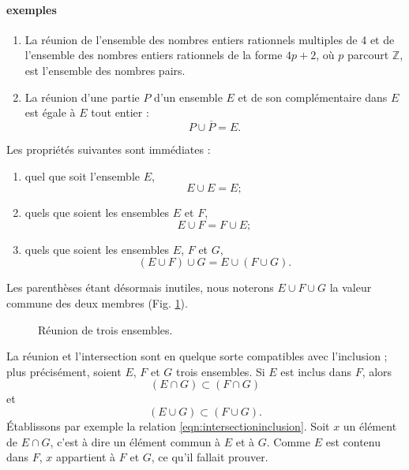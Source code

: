 \documentclass[12pt,parskip=full,chapterprefix=true,a5paper]{scrbook}
\begin{document}
\paragraph{exemples}
\begin{enumerate}
\item La réunion de l'ensemble des nombres entiers rationnels multiples de 4 et de l'ensemble des nombres entiers rationnels de la forme \(4p+2\), où \(p\) parcourt \(\mathbb{Z}\), est l'ensemble des nombres pairs.
\item La réunion d'une partie \(P\) d'un ensemble \(E\) et de son complémentaire dans \(E\) est égale à \(E\) tout entier :
  \[
    P\cup\overline{P}=E.
  \]
\end{enumerate}
Les propriétés suivantes sont immédiates :
\begin{enumerate}[label=\alph*)]
\item quel que soit l'ensemble \(E\),
  \[E\cup E=E;\]
\item quels que soient les ensembles \(E\) et \(F\),
  \[E\cup F=F\cup E;\]
\item quels que soient les ensembles \(E\), \(F\) et \(G\),
  \[(E\cup F)\cup G=E\cup (F\cup G).\]
\end{enumerate}
Les parenthèses étant désormais inutiles, nous noterons \(E\cup F\cup G\) la valeur commune des deux membres (Fig. \ref{fig:reunion3ensembles}).

\begin{figure}[ht]
  \centering
  \caption{\label{fig:reunion3ensembles}Réunion de trois ensembles.}
\end{figure}

La réunion et l'intersection sont en quelque sorte compatibles avec l'inclusion ; plus précisément, soient \(E\), \(F\) et \(G\) trois ensembles. Si \(E\) est inclus dans \(F\), alors
\begin{equation}
  \label{eqn:intersectioninclusion}
  (E\cap G)\subset(F\cap G)
\end{equation}
et
\begin{equation}
  (E\cup G)\subset(F\cup G).
\end{equation}
Établissons par exemple la relation \ref{eqn:intersectioninclusion}. Soit \(x\) un élément de \(E\cap G\), c'est à dire un élément commun à \(E\) et à \(G\). Comme \(E\) est contenu dans \(F\), \(x\) appartient à \(F\) et \(G\), ce qu'il fallait prouver.


  
\end{document}
